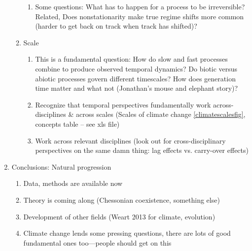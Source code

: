 \documentclass[11pt,a4paper]{article}
\begin{document}
\begin{enumerate}
\begin{enumerate}
\begin{enumerate}
\item Some questions: What has to happen for a process to be irreversible? Related, Does nonstationarity make true regime shifts more common (harder to get back on track when track has shifted)?
\end{enumerate}
\item Scale
\begin{enumerate}
\item This is a fundamental question: How do slow and fast processes combine to produce observed temporal dynamics? Do biotic versus abiotic processes govern different timescales? How does generation time matter and what not (Jonathan's mouse and elephant story)?
\item Recognize that temporal perspectives fundamentally work across-disciplines \& across scales (Scales of climate change \autoref{climatescalesfig}, concepts table -- see xls file)
\item Work across relevant disciplines (look out for cross-disciplinary perspectives on the same damn thing: lag effects vs. carry-over effects)
\end{enumerate}
\end{enumerate}
\item Conclusions: Natural progression
\begin{enumerate}
\item Data, methods are available now 
\item Theory is coming along (Chessonian coexistence, something else)
\item Development of other fields (Weart 2013 for climate, evolution)
\item Climate change lends some pressing questions, there are lots of good fundamental ones too---people should get on this
\end{enumerate}
\end{enumerate}
\end{document}
